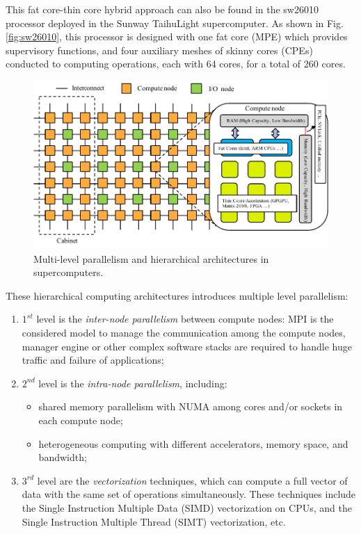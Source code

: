 This fat core-thin core hybrid approach can also be found in the sw26010 processor deployed in the Sunway TaihuLight supercomputer. As shown in Fig. \ref{fig:sw26010}, this processor is designed with one fat core (MPE) which provides supervisory functions, and four auxiliary meshes of skinny cores  (CPEs) conducted to computing operations, each with 64 cores, for a total of 260 cores.

\begin{figure}[htbp]
	\centering
	\includegraphics[width=0.99\linewidth]{fig/supercomputer_arch.pdf}
	\caption{Multi-level parallelism and hierarchical architectures in supercomputers.}
	\label{fig:supercomputer_arch}
\end{figure}

These hierarchical computing architectures introduces multiple level parallelism:

\begin{enumerate}
	\item $1^{st}$ level is the \textit{inter-node parallelism} between compute nodes: MPI is the considered model to manage the communication among the compute nodes, manager engine or other complex software stacks are required to handle huge traffic and failure of applications;
	\item $2^{nd}$ level is the \textit{intra-node parallelism}, including:
	\begin{itemize}
		\item shared memory parallelism with NUMA among cores and/or sockets in each compute node;
		\item heterogeneous computing with different accelerators, memory space, and bandwidth;
	\end{itemize}
	\item $3^{rd}$ level are the \textit{vectorization} techniques, which can compute a full vector of data with the same set of operations simultaneously. These techniques include the Single Instruction Multiple Data (SIMD) vectorization on CPUs, and the Single Instruction Multiple Thread (SIMT) vectorization, etc.
\end{enumerate}

